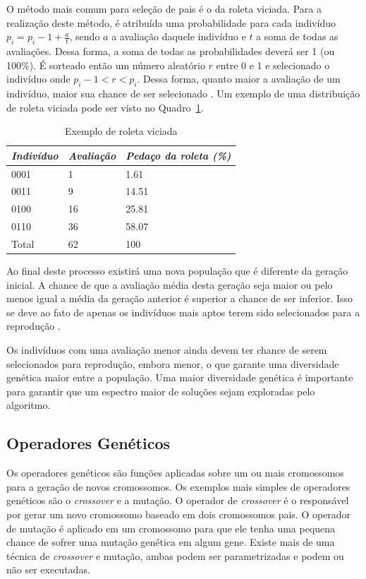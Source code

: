 \documentclass[12pt,oneside,a4paper,english,french,spanish,brazil,]{abntex2}
\begin{document}
O método mais comum para seleção de pais é o da roleta viciada. Para a realização deste método, é atribuída uma probabilidade para cada indivíduo \(p_i = p_i-1 + \frac{a}{t}\), sendo \(a\) a avaliação daquele indivíduo e \(t\) a soma de todas as avaliações. Dessa forma, a soma de todas as probabilidades deverá ser 1 (ou 100\%). É sorteado então um número aleatório \(r\) entre 0 e 1 e selecionado o indivíduo onde \(p_i-1 < r < p_i\). Dessa forma, quanto maior a avaliação de um indivíduo, maior sua chance de ser selecionado \cite{linden:2008}. Um exemplo de uma distribuição de roleta viciada pode ser visto no Quadro~\ref{tab:Roleta}.

\begin{table}[]
\centering
\caption{Exemplo de roleta viciada}
\label{tab:Roleta}
\begin{tabular}{lll}
\hline
\textit{\textbf{Indivíduo}} & \textit{\textbf{Avaliação}} & \textit{\textbf{Pedaço da roleta (\%)}} \\ \hline
0001      & 1         & 1.61                  \\
0011      & 9         & 14.51                 \\ 
0100      & 16        & 25.81                 \\ 
0110      & 36        & 58.07                 \\ 
Total     & 62        & 100                   \\ \hline
\end{tabular}
\end{table}

Ao final deste processo existirá uma nova população que é diferente da geração inicial. A chance de que a avaliação média desta geração seja maior ou pelo menos igual a média da geração anterior é superior a chance de ser inferior. Isso se deve ao fato de apenas os indivíduos mais aptos terem sido selecionados para a reprodução \cite{linden:2008}.

Os indivíduos com uma avaliação menor ainda devem ter chance de serem selecionados para reprodução, embora menor, o que garante uma diversidade genética maior entre a população. Uma maior diversidade genética é importante para garantir que um espectro maior de soluções sejam exploradas pelo algoritmo.

\subsection{Operadores Genéticos}

Os operadores genéticos são funções aplicadas sobre um ou mais cromossomos para a geração de novos cromossomos. Os exemplos mais simples de operadores genéticos são o \textit{crossover} e a mutação. O operador de \textit{crossover} é o responsável por gerar um novo cromossomo baseado em dois cromossomos pais. O operador de mutação é aplicado em um cromossomo para que ele tenha uma pequena chance de sofrer uma mutação genética em algum gene. Existe mais de uma técnica de \textit{crossover} e mutação, ambas podem ser parametrizadas e podem ou não ser executadas.
\end{document}
